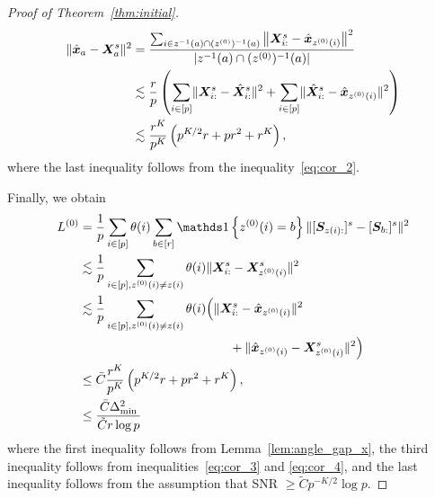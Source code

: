 \documentclass[journal]{IEEEtran}
\theoremstyle{definition}
\theoremstyle{definition}
\newcommand{\of}[1]{\left(#1\right)}
\newcommand{\offf}[1]{\left\{#1\right\}}
\begin{document}
\begin{proof}[Proof of Theorem~\ref{thm:initial}]
\vspace{-0.5cm}
\small
\begin{align}
       \onormSize{}{ \hat \mx_{a} - \mX_{a}^s  }^2  &= \frac{ \sum_{i \in z^{-1}(a) \cap (z^{(0)})^{-1} (a) } \onorm{ \mX_{i:}^s - \hat \mx_{z^{(0)}(i)}}^2 }{|z^{-1}(a) \cap (z^{(0)})^{-1} (a) |}  \\
       & \lesssim \frac{r}{p} \of{  \sum_{i \in [p]} \onormSize{}{ \mX_{i:}^s - \hat \mX_{i:}^s }^2 + \sum_{i \in [p]} \onormSize{}{\hat \mX_{i:}^s - \hat \mx_{z^{(0)}(i)}}^2 } \\
       & \lesssim  \frac{r^{K}}{p^{K}}\of{ p^{K/2}r + pr^2 + r^K}, \label{eq:cor_4}
\end{align}
\normalsize
where the last inequality follows from the inequality~\eqref{eq:cor_2}.

Finally, we obtain 
\begin{align}
     L^{(0)} &= \frac{1}{p}  \sum_{i \in [p]} \theta(i) \sum_{b \in [r]}  \ind \offf{ z^{(0)}(i) = b } \onormSize{}{ [ \mS_{  z(i):}  ]^s - [ \mS_{b:}  ]^s  }^2 \\
     & \lesssim \frac{1}{p}  \sum_{i \in [p], z^{(0)}(i) \neq z(i)} \theta(i)  \onormSize{}{ \mX_{i:}^s -  \mX_{z^{(0)}(i)}^s  }^2\\
     & \lesssim \frac{1}{p}  \sum_{i \in [p], z^{(0)}(i) \neq z(i)} \theta(i) \Big( \onormSize{}{\mX_{i:}^s - \hat \mx_{z^{(0)}(i)}}^2 \\
     &  \quad \quad \quad \quad \quad \quad \quad \quad \quad \quad\quad \quad + \onormSize{}{ \hat \mx_{z^{(0)}(i)} - \mX_{z^{(0)}(i)}^s  }^2 \Big) \\
     & \leq \bar C \frac{r^{K}}{p^{K}} \of{ p^{K/2}r + pr^2 + r^K}, \\
     & \leq \frac{\bar C\Delta_{\min}^2}{ \tilde C r \log p}
\end{align}
where the first inequality follows from Lemma~\ref{lem:angle_gap_x}, the third inequality follows from inequalities~\eqref{eq:cor_3} and \eqref{eq:cor_4}, and the last inequality follows from the assumption that SNR $\geq \tilde C p^{-K/2} \log p$.
\end{proof}
\end{document}
